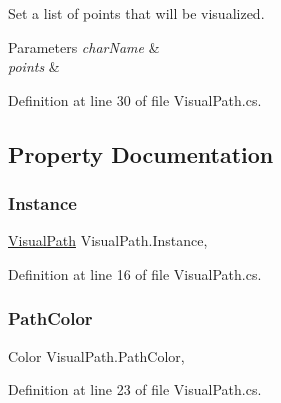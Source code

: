 Set a list of points that will be visualized. 


\begin{DoxyParams}{Parameters}
{\em char\+Name} & \\
\hline
{\em points} & \\
\hline
\end{DoxyParams}


Definition at line 30 of file Visual\+Path.\+cs.



\subsection{Property Documentation}
\mbox{\label{class_visual_path_a3809d8ab9f435b730e73c75b8776d755}} 
\subsubsection{\texorpdfstring{Instance}{Instance}}
{\footnotesize\ttfamily \hyperlink{class_visual_path}{Visual\+Path} Visual\+Path.\+Instance\hspace{0.3cm}{\ttfamily [static]}, {\ttfamily [get]}}



Definition at line 16 of file Visual\+Path.\+cs.

\mbox{\label{class_visual_path_a6a67dc78c28f2231d649210575b1e628}} 
\subsubsection{\texorpdfstring{Path\+Color}{PathColor}}
{\footnotesize\ttfamily Color Visual\+Path.\+Path\+Color\hspace{0.3cm}{\ttfamily [get]}, {\ttfamily [set]}}



Definition at line 23 of file Visual\+Path.\+cs.

\mbox{\label{class_visual_path_aeb1724daee797ed6d4226dd211b5b745}} 
